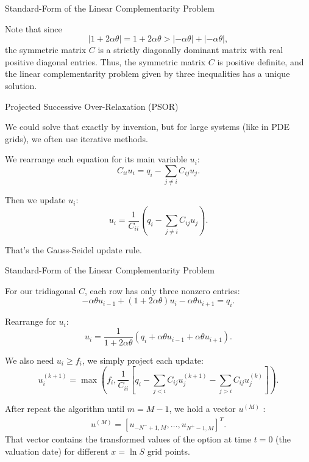 \documentclass{beamer}
\begin{document}
\begin{frame}{Standard-Form of the Linear Complementarity Problem}

    {\footnotesize \footnotesize
    Note that since
    \[
    |1 + 2\alpha\theta| = 1 + 2\alpha\theta > |-\alpha\theta| + |-\alpha\theta|,
    \]
    the symmetric matrix $C$ is a strictly diagonally dominant matrix with real positive diagonal entries. 
    Thus, the symmetric matrix $C$ is positive definite, and the linear complementarity problem 
    given by three inequalities has a unique solution.
    \vspace{1em}
    \par  \pause Projected Successive Over-Relaxation (PSOR)
    \par We could solve that exactly by inversion, but for 
    large systems (like in PDE grids), we often use iterative methods.
    \par We rearrange each equation for its main variable $u_i$:
\[
C_{ii}u_i = q_i - \sum_{j\neq i} C_{ij}u_j.
\]

Then we update $u_i$:
\[
u_i = \frac{1}{C_{ii}} \left( q_i - \sum_{j\neq i} C_{ij}u_j \right).
\]

That's the Gauss-Seidel update rule.

    }
    
    
\end{frame}
 


\begin{frame}{Standard-Form of the Linear Complementarity Problem}

    {\footnotesize \footnotesize
     For our tridiagonal $C$, each row has only three nonzero entries:
    \[
    -\alpha \theta u_{i-1} + (1 + 2\alpha \theta)u_i - \alpha \theta u_{i+1} = q_i.
    \]

    Rearrange for $u_i$:
    \[
    u_i = \frac{1}{1 + 2\alpha \theta} \left( q_i + \alpha \theta u_{i-1} + \alpha \theta u_{i+1} \right).
    \]
    
    \pause  We also need $u_i \geq f_i$, we simply project each update:
    \[
    u_i^{(k+1)} = \max \left( f_i, \frac{1}{C_{ii}} \left[ q_i - \sum_{j<i} C_{ij} u_j^{(k+1)} 
    - \sum_{j>i} C_{ij} u_j^{(k)} \right] \right).
    \]
    \vspace{1em}
    \par After repeat the algorithm until $m = M-1$, we hold a vector $u^{(M)}$ :
    \begin{align*}
        u^{(M)} = [u_{-N^- + 1, M}, \ldots, u_{N^+ - 1, M}]^T.
    \end{align*}
    That vector contains the transformed values of 
    the option at time $t = 0$ (the valuation date) for different $x = \ln S$ grid points.
    }
\end{frame}
\end{document}
